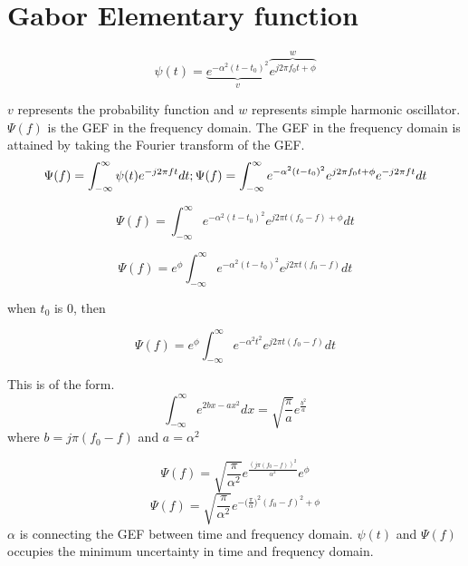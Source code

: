 \section{Gabor Elementary function}
\begin{equation}
\psi(t) = \underbrace{e^{-\alpha ^2(t-t_0)^2}}_v\overbrace{e^{j2\pi f_0 t+\phi}}^w
\end{equation}

$v$ represents the probability function and $w$ represents simple harmonic oscillator.
$\Psi(f)$ is the GEF in the frequency domain. The GEF in the frequency domain is attained by taking the Fourier transform of the GEF.
\begin{equation*}
\Psi(f) = {\int_{-\infty}^{\infty}{\psi(t) e^{-j2\pi ft}dt}};
\Psi(f) = {\int_{-\infty}^{\infty}{e^{-\alpha ^2(t-t_0)^2}e^{j2\pi f_0 t+\phi} e^{-j2\pi ft}dt}}\\
\end{equation*}

\begin{equation*}
\Psi(f) = {\int_{-\infty}^{\infty}{e^{-\alpha ^2(t-t_0)^2}e^{j2\pi t(f_0-f) +\phi}dt}}
\end{equation*}

\begin{equation*}
\Psi(f) = e^\phi{\int_{-\infty}^{\infty}{e^{-\alpha ^2(t-t_0)^2}e^{j2\pi t(f_0-f) }dt}}
\end{equation*}

when $t_0$ is 0, then

\begin{equation}
\Psi(f) = e^\phi{\int_{-\infty}^{\infty}{e^{-\alpha ^2 t^2}e^{j2\pi t(f_0-f) }dt}}
\end{equation}


This is of the form.
\begin{equation*}
\int_{-\infty}^{\infty}e^{2bx - ax^2 }dx = \sqrt{\frac{\pi}{a}} e^\frac{b^2}{a}
\end{equation*}
where $b = j \pi(f_0-f)$ and $a = \alpha ^ 2$

\begin{equation*}
\Psi(f) = \sqrt{\frac{\pi}{\alpha ^2}} e^\frac{{(j\pi (f_0-f))}^2}{\alpha ^2}e^\phi
\end{equation*}
\begin{equation*}
\Psi(f) = \sqrt{\frac{\pi}{\alpha ^2}} e^{-{(\frac{\pi} {\alpha}})^2 ({f_0-f})^2+\phi}
\end{equation*}
$\alpha$ is connecting the GEF between time and frequency domain. $\psi(t)$ and $\Psi(f)$ occupies the minimum uncertainty in time and frequency domain.


